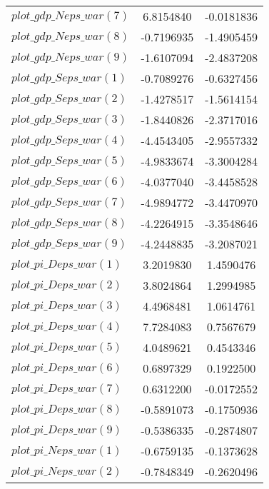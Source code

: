 \begin{center}
\begin{longtable}{lcc}
$plot\_gdp\_N eps\_war (7)  $	 & 	      6.8154840	 & 	     -0.0181836 \\ 
$plot\_gdp\_N eps\_war (8)  $	 & 	     -0.7196935	 & 	     -1.4905459 \\ 
$plot\_gdp\_N eps\_war (9)  $	 & 	     -1.6107094	 & 	     -2.4837208 \\ 
$plot\_gdp\_S eps\_war (1)  $	 & 	     -0.7089276	 & 	     -0.6327456 \\ 
$plot\_gdp\_S eps\_war (2)  $	 & 	     -1.4278517	 & 	     -1.5614154 \\ 
$plot\_gdp\_S eps\_war (3)  $	 & 	     -1.8440826	 & 	     -2.3717016 \\ 
$plot\_gdp\_S eps\_war (4)  $	 & 	     -4.4543405	 & 	     -2.9557332 \\ 
$plot\_gdp\_S eps\_war (5)  $	 & 	     -4.9833674	 & 	     -3.3004284 \\ 
$plot\_gdp\_S eps\_war (6)  $	 & 	     -4.0377040	 & 	     -3.4458528 \\ 
$plot\_gdp\_S eps\_war (7)  $	 & 	     -4.9894772	 & 	     -3.4470970 \\ 
$plot\_gdp\_S eps\_war (8)  $	 & 	     -4.2264915	 & 	     -3.3548646 \\ 
$plot\_gdp\_S eps\_war (9)  $	 & 	     -4.2448835	 & 	     -3.2087021 \\ 
$plot\_pi\_D eps\_war (1)   $	 & 	      3.2019830	 & 	      1.4590476 \\ 
$plot\_pi\_D eps\_war (2)   $	 & 	      3.8024864	 & 	      1.2994985 \\ 
$plot\_pi\_D eps\_war (3)   $	 & 	      4.4968481	 & 	      1.0614761 \\ 
$plot\_pi\_D eps\_war (4)   $	 & 	      7.7284083	 & 	      0.7567679 \\ 
$plot\_pi\_D eps\_war (5)   $	 & 	      4.0489621	 & 	      0.4543346 \\ 
$plot\_pi\_D eps\_war (6)   $	 & 	      0.6897329	 & 	      0.1922500 \\ 
$plot\_pi\_D eps\_war (7)   $	 & 	      0.6312200	 & 	     -0.0172552 \\ 
$plot\_pi\_D eps\_war (8)   $	 & 	     -0.5891073	 & 	     -0.1750936 \\ 
$plot\_pi\_D eps\_war (9)   $	 & 	     -0.5386335	 & 	     -0.2874807 \\ 
$plot\_pi\_N eps\_war (1)   $	 & 	     -0.6759135	 & 	     -0.1373628 \\ 
$plot\_pi\_N eps\_war (2)   $	 & 	     -0.7848349	 & 	     -0.2620496 \\ 

\end{longtable}
\end{center}
